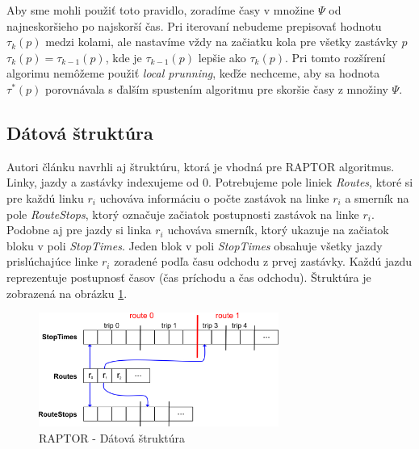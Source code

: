 Aby sme mohli použiť toto pravidlo, zoradíme časy v množine $\Psi$ od najneskoršieho po najskorší čas. Pri iterovaní nebudeme prepisovať hodnotu $\tau_k(p)$ medzi kolami, ale nastavíme vždy na začiatku kola pre všetky zastávky $p$ $\tau_k(p) = \tau_{k-1}(p)$, kde je $\tau_{k-1}(p)$ lepšie ako $\tau_k(p)$. Pri tomto rozšírení algorimu nemôžeme použiť \textit{local prunning}, keďže nechceme, aby sa hodnota $\tau^*(p)$ porovnávala s ďalším spustením algoritmu pre skoršie časy z množiny $\Psi$. 



\subsection{Dátová štruktúra}
\label{subsec:structure}
Autori článku navrhli aj štruktúru, ktorá je vhodná pre RAPTOR algoritmus. Linky, jazdy a zastávky indexujeme od $0$. Potrebujeme pole liniek \textit{Routes}, ktoré si pre každú linku $r_i$ uchováva informáciu o počte zastávok na linke $r_i$ a smerník na pole \textit{RouteStops}, ktorý označuje začiatok postupnosti zastávok na linke $r_i$. Podobne aj pre jazdy si linka $r_i$ uchováva smerník, ktorý ukazuje na začiatok bloku v poli \textit{StopTimes}. Jeden blok v poli \textit{StopTimes} obsahuje všetky jazdy prislúchajúce linke $r_i$ zoradené podľa času odchodu z prvej zastávky. Každú jazdu reprezentuje postupnosť časov (čas príchodu a čas odchodu). Štruktúra je zobrazená na obrázku \ref{fig:raptor-structure}. 

\begin{figure}[H]
\centerline{\includegraphics[width=0.7\textwidth]{images/raptor-structure}}
\caption[RAPTOR - Dátová štruktúra]{RAPTOR - Dátová štruktúra}
\label{fig:raptor-structure}
\end{figure}

